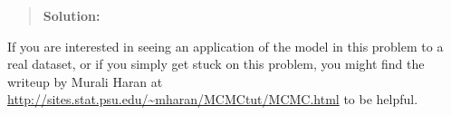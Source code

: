 \documentclass{article}
\begin{document}
\begin{enumerate}
\begin{enumerate}
\begin{quotation}{\bf Solution:}
    \end{quotation}

    \end{enumerate}

  If you are interested in seeing an application of the model in this problem to
  a real dataset, or if you simply get stuck on this problem, you might find the
  writeup by Murali Haran at 
  \url{http://sites.stat.psu.edu/~mharan/MCMCtut/MCMC.html} to be helpful.

\end{enumerate}
\end{document}
